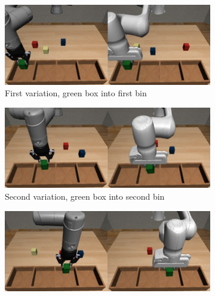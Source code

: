 \begin{figure}[hbt!]
    \centering
    \begin{subfigure}{0.3\textwidth}
        \centering
        \includegraphics[width=\textwidth]{Figures/images/pick_place/task_1.png}
        \caption{First variation, green box into first bin}
        \label{fig:first_variation}
    \end{subfigure}
    \hspace{10px}
    \begin{subfigure}{0.3\textwidth}
        \centering
        \includegraphics[width=\textwidth]{Figures/images/pick_place/task_2.png}
        \caption{Second variation, green box into second bin}
        \label{fig:second_variation}
    \end{subfigure}
    \hspace{10px}
    \begin{subfigure}{0.3\textwidth}
        \centering
        \includegraphics[width=\textwidth]{Figures/images/pick_place/task_3.png}

\end{subfigure}
\end{figure}
